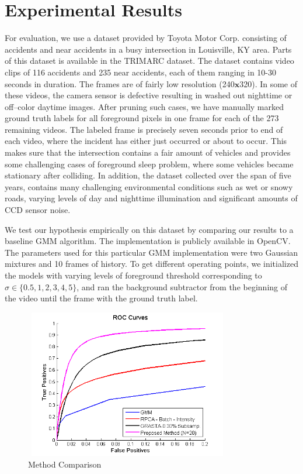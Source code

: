 \documentclass{article}
\begin{document}
\section{Experimental Results}
For evaluation, we use a dataset provided by Toyota Motor Corp. consisting of accidents and near accidents in a busy intersection in Louisville, KY area.  Parts of this dataset is available in the TRIMARC dataset\cite{toyota_dataset}.  The dataset contains video clips of 116 accidents and 235 near accidents, each of them ranging in 10-30 seconds in duration.  The frames are of fairly low resolution (240$\mathbf{x}$320). In some of these videos, the camera sensor is defective resulting in washed out nighttime or off--color daytime images.  After pruning such cases, we have manually marked ground truth labels for all foreground pixels in one frame for each of the 273 remaining videos.  The labeled frame is precisely seven seconds prior to end of each video, where the incident has either just occurred or about to occur.  This makes sure that the intersection contains a fair amount of vehicles and provides some challenging cases of foreground sleep problem, where some vehicles became stationary after colliding.  In addition, the dataset collected over the span of five years, contains many challenging environmental conditions such as wet or snowy roads, varying levels of day and nighttime illumination and significant amounts of CCD sensor noise.

We test our hypothesis empirically on this dataset by comparing our results to a baseline GMM\cite{ZivGMM} algorithm.  The implementation is publicly available in OpenCV\cite{opencv_library}.  The parameters used for this particular GMM implementation were two Gaussian mixtures and 10 frames of history.  To get different operating points, we initialized the models with varying levels of foreground threshold corresponding to $\sigma \in \{0.5, 1, 2, 3, 4, 5\}$, and ran the background subtractor from the beginning of the video until the frame with the ground truth label.

\begin{figure}[htb]
\begin{minipage}[b]{\linewidth}
  \centering
  \centerline{\includegraphics[width=9cm, height = 6.5cm]{Imgs/ROC_comp_curve_zoom.png}}
\end{minipage}

\caption{Method Comparison}
\label{fig:roc}
\end{figure}
\end{document}
